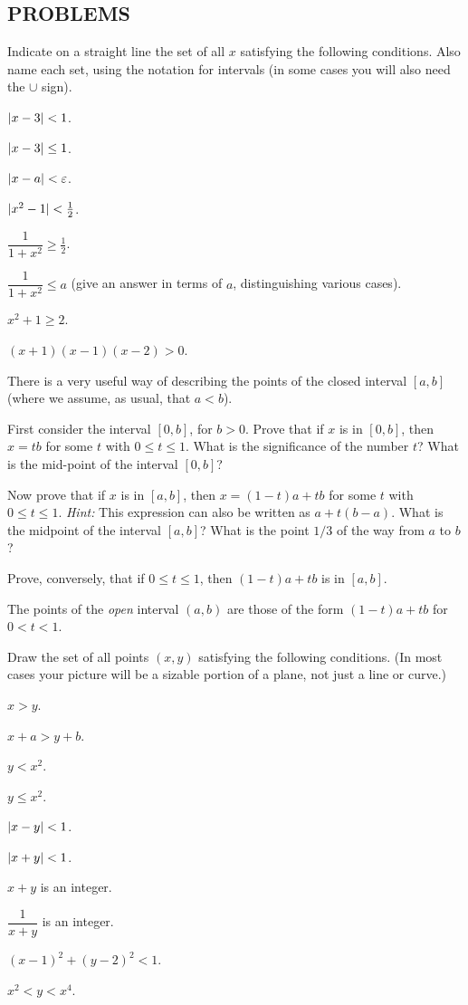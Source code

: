 \subsection*{PROBLEMS}

 Indicate on a straight line the set of all $x$ satisfying the
following conditions. Also name each set, using the notation for intervals (in
some cases you will also need the $\cup$ sign).
\begin{romans}
\item $\lvert x-3\rvert<1$.
\item $\lvert x-3\rvert\leq 1$.
\item $\lvert x-a\rvert<\varepsilon$.
\item $\lvert x^2-1\rvert<\frac12$.
\item $\dfrac{1}{1+x^2}\geq\frac12$.
\item $\dfrac{1}{1+x^2}\leq a$ (give an answer in terms of $a$, distinguishing
  various cases).
\item $x^2+1\geq 2$.
\item $(x+1)(x-1)(x-2)>0$.
\end{romans}

 There is a very useful way of describing the points of the closed
interval $[a,b]$ (where we assume, as usual, that $a<b$).
\begin{letters}
\item First consider the interval $[0,b]$, for $b>0$. Prove that if $x$ is in
  $[0,b]$, then $x=tb$ for some $t$ with $0\leq t\leq 1$. What is the
  significance of the number $t$? What is the mid-point of the interval
  $[0,b]$?
\item Now prove that if $x$ is in $[a,b]$, then $x=(1-t)a+tb$ for some $t$ with
  $0\leq t\leq 1$. \textit{Hint:} This expression can also be written as
  $a+t(b-a)$. What is the midpoint of the interval $[a,b]$? What is the point
  $1/3$ of the way from $a$ to $b$?
\item Prove, conversely, that if $0\leq t\leq 1$, then $(1-t)a+tb$ is in
  $[a,b]$.
\item The points of the \emph{open} interval $(a,b)$ are those of the form
  $(1-t)a+tb$ for $0<t<1$.
\end{letters}

 Draw the set of all points $(x,y)$ satisfying the following
conditions. (In most cases your picture will be a sizable portion of a plane,
not just a line or curve.)
\begin{romans}
\item $x>y$.
\item $x+a>y+b$.
\item $y<x^2$.
\item $y\leq x^2$.
\item $\lvert x-y\rvert<1$.
\item $\lvert x+y\rvert<1$.
\item $x+y$ is an integer.
\item $\dfrac{1}{x+y}$ is an integer.
\item $(x-1)^2+(y-2)^2<1$.
\item $x^2<y<x^4$.
\end{romans}


